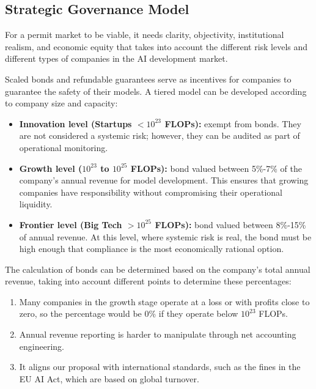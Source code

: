 \subsection{Strategic Governance Model}

For a permit market to be viable, it needs clarity, objectivity, institutional realism, and economic equity that takes into account the different risk levels and different types of companies in the AI development market.

Scaled bonds and refundable guarantees serve as incentives for companies to guarantee the safety of their models. A tiered model can be developed according to company size and capacity:

\begin{itemize}
    \item \textbf{Innovation level (Startups $< 10^{23}$ FLOPs):} exempt from bonds. They are not considered a systemic risk; however, they can be audited as part of operational monitoring.
    
    \item \textbf{Growth level ($10^{23}$ to $10^{25}$ FLOPs):} bond valued between 5\%-7\% of the company's annual revenue for model development. This ensures that growing companies have responsibility without compromising their operational liquidity.
    
    \item \textbf{Frontier level (Big Tech $> 10^{25}$ FLOPs):} bond valued between 8\%-15\% of annual revenue. At this level, where systemic risk is real, the bond must be high enough that compliance is the most economically rational option.
\end{itemize}

The calculation of bonds can be determined based on the company's total annual revenue, taking into account different points to determine these percentages:

\begin{enumerate}
    \item Many companies in the growth stage operate at a loss or with profits close to zero, so the percentage would be 0\% if they operate below $10^{23}$ FLOPs.
    
    \item Annual revenue reporting is harder to manipulate through net accounting engineering.
    
    \item It aligns our proposal with international standards, such as the fines in the EU AI Act, which are based on global turnover.
\end{enumerate}

